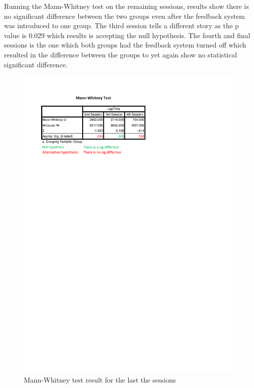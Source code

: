 Running the Mann-Whitney test on the remaining sessions, results show there is no significant difference between the two groups even after the feedback system was introduced to one group. The third session tells a different story as the p value is 0.029 which results is accepting the null hypothesis. The fourth and final sessions is the one which both groups had the feedback system turned off which resulted in the difference between the groups to yet again show no statistical significant difference.

\begin{figure}[!htb]
	\centering
	\includegraphics[width=\textwidth]{charts/Mann-Whitney-Sessions.pdf}
	\caption[Mann-Whitney Accross Sessions]{Mann-Whitney test result for the last the sessions}
	\label{fig:chart-Mann-Whitney-Sessions}
\end{figure}